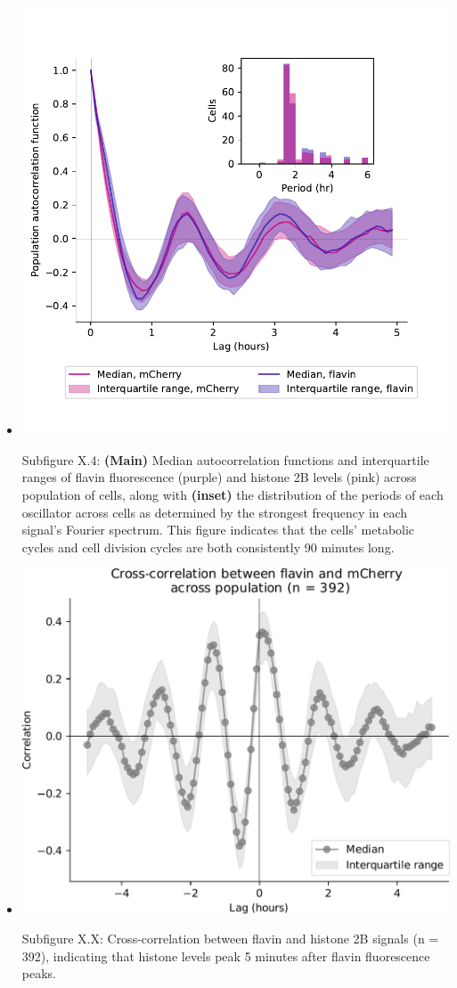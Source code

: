 \begin{itemize}
\begin{itemize}
\item \begin{center}
\includegraphics[width=.9\linewidth]{acf_and_histogram.pdf}
\end{center} Subfigure X.4: \textbf{(Main)} Median autocorrelation functions and interquartile ranges of flavin fluorescence (purple) and histone 2B levels (pink) across population of cells, along with \textbf{(inset)} the distribution of the periods of each oscillator across cells as determined by the strongest frequency in each signal's Fourier spectrum.  This figure indicates that the cells' metabolic cycles and cell division cycles are both consistently 90 minutes long.
\end{itemize}

\begin{itemize}
\item \begin{center}
\includegraphics[width=.9\linewidth]{xcf_edit.pdf}
\end{center} Subfigure X.X: Cross-correlation between flavin and histone 2B signals (n = 392), indicating that histone levels peak 5 minutes after flavin fluorescence peaks.
\end{itemize}
\end{itemize}


